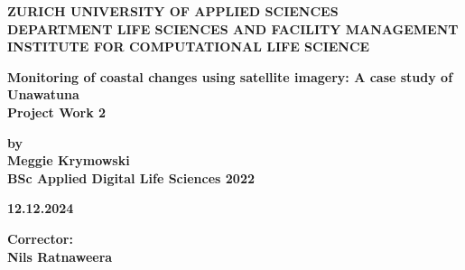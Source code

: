 \documentclass[a4paper,12pt]{article}
\begin{document}
 
\begin{titlepage}
    \begin{center}
        \singlespacing
 
        \vspace*{2cm}
 
        \textbf{\large ZURICH UNIVERSITY OF APPLIED SCIENCES} \\
        \textbf{\large DEPARTMENT LIFE SCIENCES AND FACILITY MANAGEMENT} \\
        \textbf{\large INSTITUTE FOR COMPUTATIONAL LIFE SCIENCE} \\
 
        \vspace{4cm}
 
        \textbf{\Large Monitoring of coastal changes using satellite imagery: A case study of Unawatuna} \\
        \vspace{0.5cm}
        \textbf{\Large Project Work 2} \\
 
        \vspace{5cm}
 
        \textbf{\large by} \\
        \textbf{\large Meggie Krymowski} \\
        \textbf{\large BSc Applied Digital Life Sciences 2022} \\
 
        \vspace{1cm}
 
        \textbf{\large 12.12.2024} \\
        \end{center}
        \vfill
        \begin{flushleft}
        \textbf{\large Corrector:} \\
        \textbf{\large Nils Ratnaweera} \\
        \end{flushleft}
\end{titlepage}
\setlength{\parindent}{0pt}
 
\end{document}
